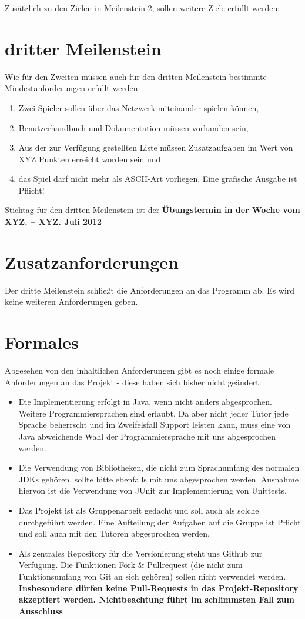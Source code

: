 \documentclass{programmierpraktikum}
\subtitle{Bomberman}
\begin{document}
\maketitle
Zusätzlich zu den Zielen in Meilenstein 2, sollen weitere Ziele erfüllt werden:
%
\section{dritter Meilenstein}
Wie für den Zweiten müssen auch für den dritten Meilenstein bestimmte Mindestanforderungen erfüllt werden:
\begin{enumerate}
  \item Zwei Spieler sollen über das Netzwerk miteinander spielen können,
  \item Benutzerhandbuch und Dokumentation müssen vorhanden sein,
  \item Aus der zur Verfügung gestellten Liste müssen Zusatzaufgaben im Wert von XYZ Punkten erreicht worden sein und
  \item das Spiel darf nicht mehr als ASCII-Art vorliegen. Eine grafische Ausgabe ist Pflicht!
\end{enumerate}
Stichtag für den dritten Meilenstein ist der \textbf{Übungstermin in der Woche vom XYZ. -- XYZ. Juli 2012}
\section{Zusatzanforderungen}
Der dritte Meilenstein schließt die Anforderungen an das Programm ab. Es wird keine weiteren Anforderungen geben.
\section{Formales}
Abgesehen von den inhaltlichen Anforderungen gibt es noch einige formale Anforderungen an das Projekt - diese haben sich bisher nicht geändert:
\begin{itemize}
  \item Die Implementierung erfolgt in Java, wenn nicht anders abgesprochen. Wei\-te\-re Pro\-gram\-mier\-sprachen sind erlaubt. Da aber nicht jeder Tutor jede Sprache beherrscht und im Zweifelsfall Support leisten kann, muss eine von Java abweichende Wahl der Programmiersprache mit uns abgesprochen werden.
  \item Die Verwendung von Bibliotheken, die nicht zum Sprachumfang des normalen JDKs gehören, sollte bitte ebenfalls mit uns abgesprochen werden. Ausnahme hiervon ist die Verwendung von JUnit zur Implementierung von Unittests.
  \item Das Projekt ist als Gruppenarbeit gedacht und soll auch als solche durchgeführt werden. Eine Aufteilung der Aufgaben auf die Gruppe ist Pflicht und soll auch mit den Tutoren abgesprochen werden.
  \item Als zentrales Repository für die Versionierung steht uns Github zur Verfügung. Die Funktionen Fork \& Pullrequest (die nicht zum Funktionsumfang von Git an sich gehören) sollen nicht verwendet werden. \textbf{Insbesondere dürfen keine Pull-Requests in das Projekt-Repository akzeptiert werden. Nichtbeachtung führt im schlimmsten Fall zum Ausschluss}
\end{itemize}
\end{document}
